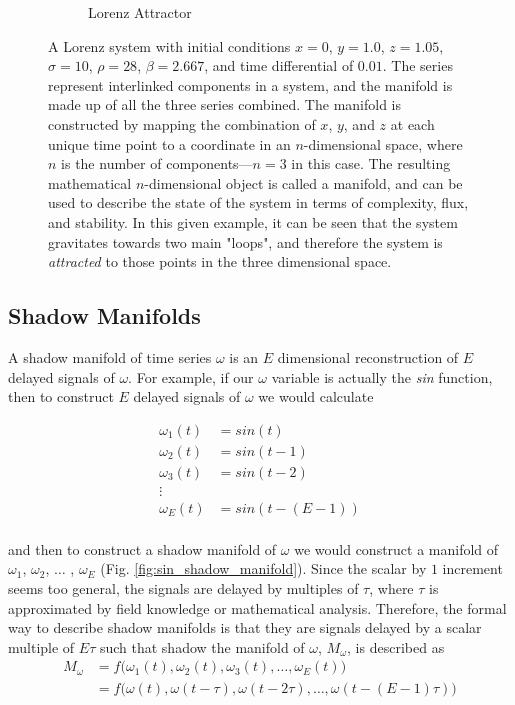 \begin{figure}
\begin{subfigure}{0.45\linewidth}
		\caption{Lorenz Attractor}
		\label{fig:lorenz_attractor}
	\end{subfigure}
	\caption{A Lorenz system with initial conditions $x=0$, $y=1.0$, $z=1.05$, $\sigma=10$, $\rho=28$, $\beta=2.667$, and time differential of $0.01$. The series represent interlinked components in a system, and the manifold is made up of all the three series combined. The manifold is constructed by mapping the combination of $x$, $y$, and $z$ at each unique time point to a coordinate in an $n$-dimensional space, where $n$ is the number of components---$n=3$ in this case. The resulting mathematical $n$-dimensional object is called a manifold, and can be used to describe the state of the system in terms of complexity, flux, and stability. In this given example, it can be seen that the system gravitates towards two main "loops", and therefore the system is \textit{attracted} to those points in the three dimensional space.}
	\label{fig:lorenz}
\end{figure}

\subsection{Shadow Manifolds}
A shadow manifold of time series $\omega$ is an $E$ dimensional reconstruction of $E$ delayed signals of $\omega$. For example, if our $\omega$ variable is actually the \textit{sin} function, then to construct $E$ delayed signals of $\omega$ we would calculate

\begin{align*}
	\omega_1(t) &= sin(t) \\
	\omega_2(t) &= sin(t-1) \\
	\omega_3(t) &= sin(t-2) \\
	\vdots& \\
	\omega_E(t) &= sin(t-(E-1)) \\
\end{align*}

and then to construct a shadow manifold of $\omega$ we would construct a manifold of $\omega_1$, $\omega_2$, $\dots$ , $\omega_E$ (Fig. \ref{fig:sin_shadow_manifold}). Since the scalar by $1$ increment seems too general, the signals are delayed by multiples of $\tau$, where $\tau$ is approximated by field knowledge or mathematical analysis. Therefore, the formal way to describe shadow manifolds is that they are signals delayed by a  scalar multiple of $E\tau$ such that shadow the manifold of $\omega$, $M_{\omega}$, is described as 
\begin{align*}
	M_{\omega} &= f\Big(\omega_1(t), \omega_2(t), \omega_3(t), \dots, \omega_E(t)\Big)\\
	&= f\Big(\omega(t), \omega(t-\tau), \omega(t-2\tau), \dots, \omega(t-(E-1)\tau)\Big)
\end{align*}


